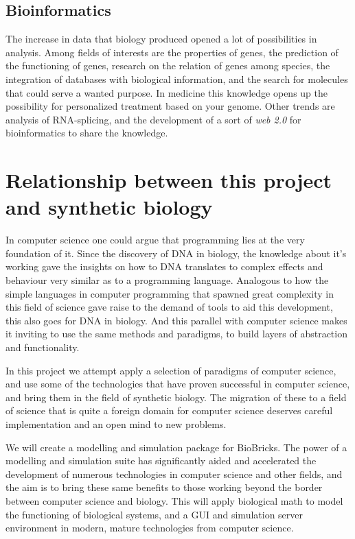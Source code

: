 \documentclass[a4paper]{article}
\begin{document}
\subsection{Bioinformatics}
The increase in data that biology produced opened a lot of possibilities in analysis. Among fields of interests are the properties of genes, the prediction of the functioning of genes, research on the relation of genes among species, the integration of databases with biological information, and the search for molecules that could serve a wanted purpose. In medicine this knowledge opens up the possibility for personalized treatment based on your genome. Other trends are analysis of RNA-splicing, and the development of a sort of \textit{web 2.0} for bioinformatics to share the knowledge.

\section{Relationship between this project and synthetic biology}

In computer science one could argue that programming lies at the very foundation of it. Since the discovery of DNA in biology, the knowledge about it's working gave the insights on how to DNA translates to complex effects and behaviour very similar as to a programming language. Analogous to how the simple languages in computer programming that spawned great complexity in this field of science gave raise to the demand of tools to aid this development, this  also goes for DNA in biology. And this parallel with computer science makes it inviting to use the same methods and paradigms, to build layers of abstraction and functionality.

In this project we attempt apply a selection of paradigms of computer science, and use some of the technologies that have proven successful in computer science, and bring them in the field of synthetic biology. The migration of these to a field of science that is quite a foreign domain for computer science deserves careful implementation and an open mind to new problems.

We will create a modelling and simulation package for BioBricks. The power of a modelling and simulation suite has significantly aided and accelerated the development of numerous technologies in computer science and other fields, and the aim is to bring these same benefits to those working beyond the border between computer science and biology. This will apply  biological  math to model the functioning of biological systems, and a GUI and simulation server environment in modern, mature technologies from computer science.
\end{document}
